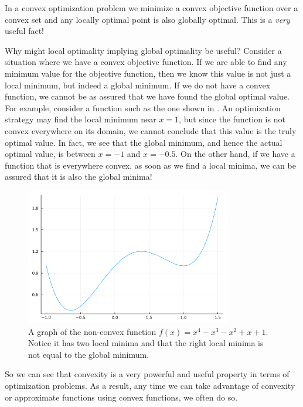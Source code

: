 In a convex optimization problem we minimize a convex objective function over a convex set and any locally optimal point is also globally optimal. This is a \textit{very} useful fact!

Why might local optimality implying global optimality be useful? Consider a situation where we have a convex objective function. If we are able to find any minimum value for the objective function, then we know this value is not just a local minimum, but indeed a global minimum. If we do not have a convex function, we cannot be as assured that we have found the global optimal value. For example, consider a function such as the one shown in . An optimization strategy may find the local minimum near $x=1$, but since the function is not convex everywhere on its domain, we cannot conclude that this value is the truly optimal value. In fact, we see that the global minimum, and hence the actual optimal value, is between $x=-1$ and $x=-0.5$. On the other hand, if we have a function that is everywhere convex, as soon as we find a local minima, we can be assured that it is also the global minima!

\begin{figure}
	\centering
	\includegraphics[width=0.8\textwidth]{Chapter_I_Background/Images/Non-Convex-Example.png}
	\caption[A Non-Convex Function]{A graph of the non-convex function $f(x)=x^4-x^3-x^2+x+1$. Notice it has two local minima and that the right local minima is not equal to the global minimum.}
	\label{fig:non-convex-function-example}
\end{figure}

So we can see that convexity is a very powerful and useful property in terms of optimization problems. As a result, any time we can take advantage of convexity or approximate functions using convex functions, we often do so.